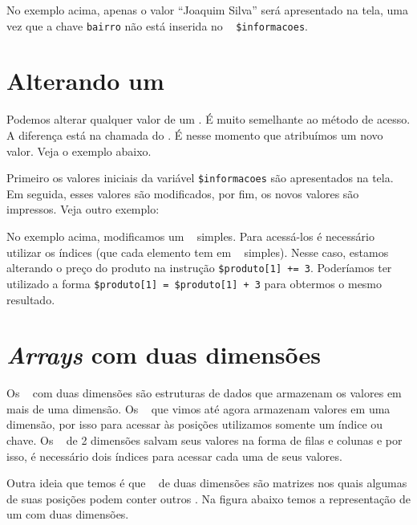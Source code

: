 

No exemplo acima, apenas o valor ``Joaquim Silva'' será apresentado na tela, uma vez que
a chave \texttt{bairro} não está inserida no \tipoarray~ \texttt{\$informacoes}.

\section{Alterando um \tipoarray}
\label{alterando-um-array}

Podemos alterar qualquer valor de um \tipoarray. É muito semelhante ao método de acesso. 
A diferença está na chamada do \tipoarray. É nesse momento que atribuímos um novo valor.
Veja o exemplo abaixo.



Primeiro os valores iniciais da variável \texttt{\$informacoes} são apresentados na tela.
Em seguida, esses valores são modificados, por fim, os novos valores são impressos.
Veja outro exemplo:



No exemplo acima, modificamos um \tipoarray~ simples. Para acessá-los é necessário utilizar
os índices (que cada elemento tem em \tipoarrays~ simples). Nesse caso, estamos alterando
o preço do produto na instrução \texttt{\$produto[1] += 3}. Poderíamos ter utilizado a forma
\texttt{\$produto[1] = \$produto[1] + 3} para obtermos o mesmo resultado.

\section{\textit{Arrays} com duas dimensões}
\label{arrays-com-duas-dimensoes}

Os \tipoarrays~ com duas dimensões são estruturas de dados que armazenam os valores em 
mais de uma dimensão. Os \tipoarrays~ que vimos até agora armazenam valores em uma dimensão, 
por isso para acessar às posições utilizamos somente um índice ou chave. Os \tipoarrays~ de 
2 dimensões salvam seus valores na forma de filas e colunas e por isso, é 
necessário dois índices para acessar cada uma de seus valores.

Outra ideia que temos é que \tipoarrays~ de duas dimensões são matrizes nos quais 
algumas de suas posições podem conter outros \tipoarrays. Na figura abaixo temos a 
representação de um \tipoarray com duas dimensões.

